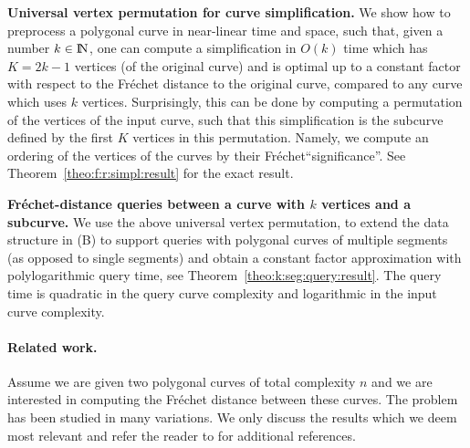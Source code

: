 \documentclass[12pt]{article}
\newcommand{\thmref}[1]{Theorem~\ref{theo:#1}}
\newcommand{\Frechet}{Fr\'{e}c{h}e{}t\xspace}\providecommand{\Arr}{\mathop{\mathrm{\EuScript{A}}}}
\newcommand{\Na}{{\rm I\!\hspace{-0.025em} N}}
\newcommand{\SNumVertices}[1]{2#1 - 1}
\numberwithin{figure}{section}
\numberwithin{equation}{section}
\begin{document}
\begin{compactenum}[(A)]
    \item \textbf{Universal vertex permutation for curve
       simplification.} We show how to preprocess a polygonal curve in near-linear time
    and space, such that, given a number $k \in \Na$, one can compute
    a simplification in $O(k)$ time which has $K= \SNumVertices{k}$
    vertices (of the original curve) and is optimal up to a constant
    factor with respect to the \Frechet distance to the original
    curve, compared to any curve which uses $k$
    vertices. Surprisingly, this can be done by computing a
    permutation of the vertices of the input curve, such that this
    simplification is the subcurve defined by the first $K$ vertices
    in this permutation. Namely, we compute an ordering of the
    vertices of the curves by their \Frechet ``significance''.  See
    \thmref{f:r:simpl:result} for the exact result.
    
    \item \textbf{\Frechet-distance queries between a curve with $k$
       vertices and a subcurve.}  We use the above universal vertex
    permutation, to extend the data structure in (B) to support
    queries with polygonal curves of multiple segments (as opposed to
    single segments) and obtain a constant factor approximation with
    polylogarithmic query time, see \thmref{k:seg:query:result}. The
    query time is quadratic in the query curve complexity and
    logarithmic in the input curve complexity.
    
\end{compactenum}


\paragraph{Related work.}Assume we are given two polygonal curves of total complexity $n$ and
we are interested in computing the \Frechet distance between these
curves. The problem has been studied in many variations.  We only
discuss the results which we deem most relevant and refer the reader
to \cite{bbmm-fswd-12} for additional references.
\end{document}
